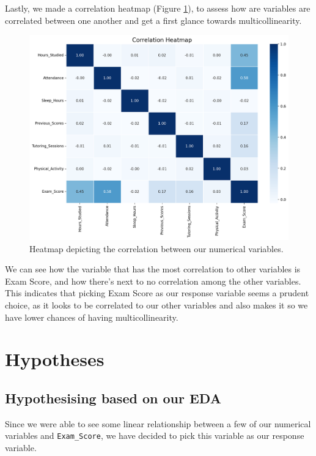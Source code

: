 \documentclass[twocolumn]{article} %
\begin{document}
Lastly, we made a correlation heatmap (Figure \ref{4:corr-heatmap}), to assess how are variables are correlated between one another and get a first glance towards multicollinearity.

\begin{figure}[h]
  \centering
  \includegraphics[width=1.3\columnwidth]{4-correlation-heatmap.png}
  \caption{Heatmap depicting the correlation between our numerical variables.}
  \label{4:corr-heatmap}
\end{figure}

We can see how the variable that has the most correlation to other variables is Exam Score, and how there's next to no correlation among the other variables. This indicates that picking Exam Score as our response variable seems a prudent choice, as it looks to be correlated to our other variables and also makes it so we have lower chances of having multicollinearity.

\newpage
\section{Hypotheses}

\subsection*{Hypothesising based on our EDA}
Since we were able to see some linear relationship between a few of our numerical variables and \texttt{Exam\_Score}, we have decided to pick this variable as our response variable.
\end{document}
